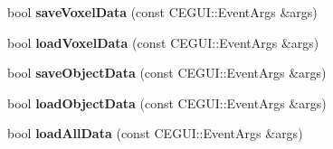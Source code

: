 \begin{DoxyCompactItemize}
\item 
\hypertarget{classGame_a2145f93cbaf763c0e3756e0ab263f33e}{
bool {\bfseries save\-Voxel\-Data} (const \-C\-E\-G\-U\-I\-::\-Event\-Args \&args)}
\label{d9/d68/classGame_a2145f93cbaf763c0e3756e0ab263f33e}

\item 
\hypertarget{classGame_a06c93f2d670292e152deb27a52abfaf5}{
bool {\bfseries load\-Voxel\-Data} (const \-C\-E\-G\-U\-I\-::\-Event\-Args \&args)}
\label{d9/d68/classGame_a06c93f2d670292e152deb27a52abfaf5}

\item 
\hypertarget{classGame_aaca33697a3f35a54f8bfe4aaf658a1d0}{
bool {\bfseries save\-Object\-Data} (const \-C\-E\-G\-U\-I\-::\-Event\-Args \&args)}
\label{d9/d68/classGame_aaca33697a3f35a54f8bfe4aaf658a1d0}

\item 
\hypertarget{classGame_a9f72551867cbf1903853e0efd4f9c698}{
bool {\bfseries load\-Object\-Data} (const \-C\-E\-G\-U\-I\-::\-Event\-Args \&args)}
\label{d9/d68/classGame_a9f72551867cbf1903853e0efd4f9c698}

\item 
\hypertarget{classGame_a0cd3a2d2b218b62b4f905ac1822706a1}{
bool {\bfseries load\-All\-Data} (const \-C\-E\-G\-U\-I\-::\-Event\-Args \&args)}
\label{d9/d68/classGame_a0cd3a2d2b218b62b4f905ac1822706a1}

\end{DoxyCompactItemize}
